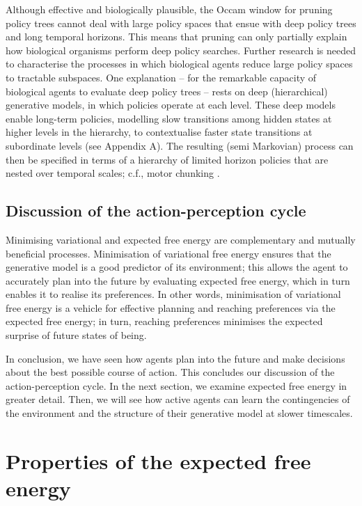 \documentclass{article}
\begin{document}
Although effective and biologically plausible, the Occam window for pruning policy trees cannot deal with large policy spaces that ensue with deep policy trees and long temporal horizons. This means that pruning can only partially explain how biological organisms perform deep policy searches. Further research is needed to characterise the processes in which biological agents reduce large policy spaces to tractable subspaces. One explanation -- for the remarkable capacity of biological agents to evaluate deep policy trees -- rests on deep (hierarchical) generative models, in which policies operate at each level. These deep models enable long-term policies, modelling slow transitions among hidden states at higher levels in the hierarchy, to contextualise faster state transitions at subordinate levels (see Appendix A). The resulting (semi Markovian) process can then be specified in terms of a hierarchy of limited horizon policies that are nested over temporal scales; c.f., motor chunking \cite{dehaeneNeuralRepresentationSequences2015,fonollosaLearningChunkingSequences2015,harunoHierarchicalMOSAICMovement2003}.

\subsection{Discussion of the action-perception cycle}

Minimising variational and expected free energy are complementary and mutually beneficial processes. Minimisation of variational free energy ensures that the generative model is a good predictor of its environment; this allows the agent to accurately plan into the future by evaluating expected free energy, which in turn enables it to realise its preferences. In other words, minimisation of variational free energy is a vehicle for effective planning and reaching preferences via the expected free energy; in turn, reaching preferences minimises the expected surprise of future states of being.

In conclusion, we have seen how agents plan into the future and make decisions about the best possible course of action. This concludes our discussion of the action-perception cycle. In the next section, we examine expected free energy in greater detail. Then, we will see how active agents can learn the contingencies of the environment and the structure of their generative model at slower timescales.



\section{Properties of the expected free energy}
\label{sec: efe}
\end{document}
